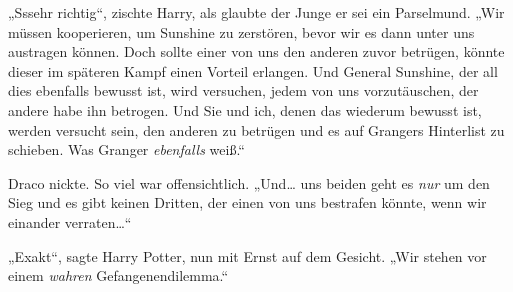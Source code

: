 „Sssehr richtig“, zischte Harry, als glaubte der Junge er sei ein Parselmund. „Wir müssen kooperieren, um Sunshine zu zerstören, bevor wir es dann unter uns austragen können. Doch sollte einer von uns den anderen zuvor betrügen, könnte dieser im späteren Kampf einen Vorteil erlangen. Und General Sunshine, der all dies ebenfalls bewusst ist, wird versuchen, jedem von uns vorzutäuschen, der andere habe ihn betrogen. Und Sie und ich, denen das wiederum bewusst ist, werden versucht sein, den anderen zu betrügen und es auf Grangers Hinterlist zu schieben. Was Granger \emph{ebenfalls} weiß.“

Draco nickte. So viel war offensichtlich. „Und… uns beiden geht es \emph{nur} um den Sieg und es gibt keinen Dritten, der einen von uns bestrafen könnte, wenn wir einander verraten…“

„Exakt“, sagte Harry Potter, nun mit Ernst auf dem Gesicht. „Wir stehen vor einem \emph{wahren} Gefangenendilemma.“

